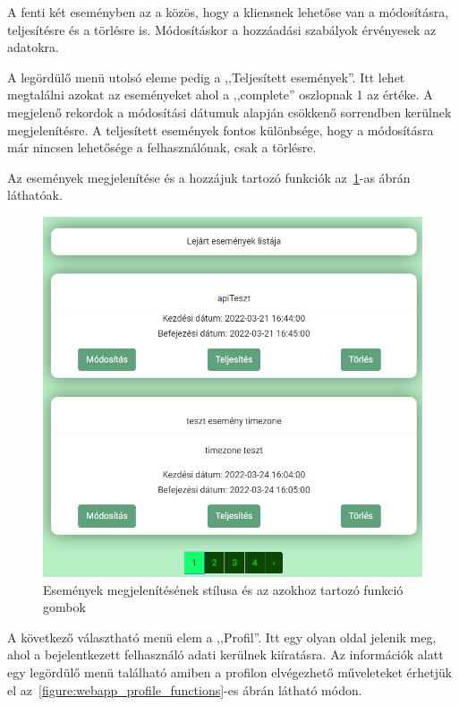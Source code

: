 \documentclass[
]{thesis-ekf}
\theoremstyle{definition}
\theoremstyle{remark}
\begin{document}
	A fenti két eseményben az a közös, hogy a kliensnek lehetőse van a módosításra, teljesítésre és a törlésre is. Módosításkor a hozzáadási szabályok érvényesek az adatokra.
	
	A legördülő menü utolsó eleme pedig a ,,Teljesített események''. Itt lehet megtalálni azokat az eseményeket ahol a ,,complete'' oszlopnak 1 az értéke. A megjelenő rekordok a módosítási dátumuk alapján csökkenő sorrendben kerülnek megjelenítésre. A teljesített események fontos különbsége, hogy a módosításra már nincsen lehetősége a felhasználónak, csak a törlésre.
	
	Az események megjelenítése és a hozzájuk tartozó funkciók az~\ref{figure:webapp_event_list_functions}-as ábrán láthatóak.
	
	\begin{figure}[ht!]
		\centering
		\includegraphics[width=1\textwidth]{web_app/web_events_list_and_functions}
		\caption{Események megjelenítésének stílusa és az azokhoz tartozó funkció gombok}
		\label{figure:webapp_event_list_functions}
	\end{figure}
	
	A következő választható menü elem a ,,Profil''. Itt egy olyan oldal jelenik meg, ahol a bejelentkezett felhasználó adati kerülnek kiíratásra. Az információk alatt egy legördülő menü található amiben a profilon elvégezhető műveleteket érhetjük el az~\ref{figure:webapp_profile_functions}-es ábrán látható módon.
	
\end{document}
